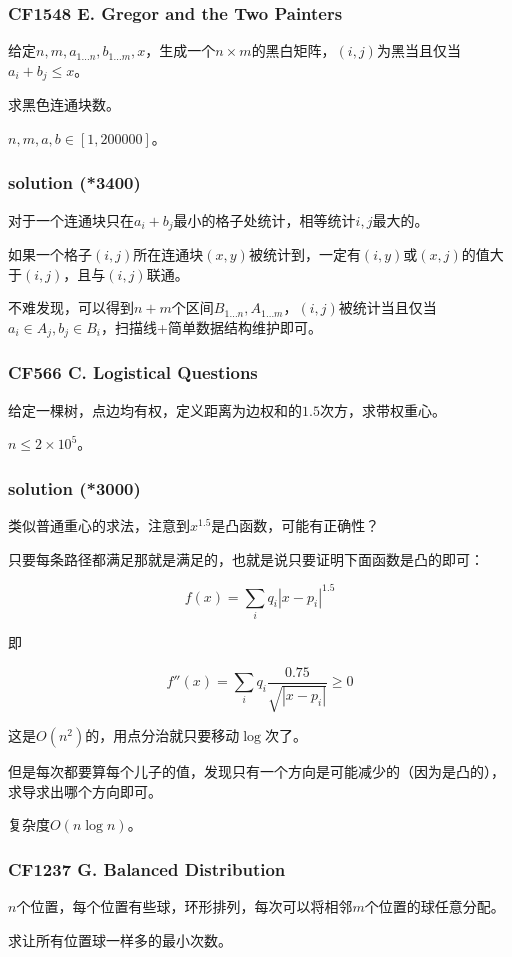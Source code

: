 \documentclass[10pt]{beamer}
\begin{document}
	\clearpage
	\begin{frame}
		\frametitle{CF1548 E. Gregor and the Two Painters}
	
		给定$n,m,a_{1\dots n},b_{1\dots m},x$，生成一个$n\times m$的黑白矩阵，$(i,j)$为黑当且仅当$a_i+b_j\le x$。
		
		求黑色连通块数。

		$n,m,a,b\in [1,200000]$。
	
	\end{frame}
	\clearpage
	\begin{frame}
		\frametitle{solution (*3400)}
	
		对于一个连通块只在$a_i+b_j$最小的格子处统计，相等统计$i,j$最大的。

		如果一个格子$(i,j)$所在连通块$(x,y)$被统计到，一定有$(i,y)$或$(x,j)$的值大于$(i,j)$，且与$(i,j)$联通。

		不难发现，可以得到$n+m$个区间$B_{1\dots n},A_{1\dots m}$，$(i,j)$被统计当且仅当$a_i\in A_j,b_j\in B_i$，扫描线+简单数据结构维护即可。
	
	\end{frame}
	\clearpage
	\begin{frame}
		\frametitle{CF566 C. Logistical Questions}
	
		给定一棵树，点边均有权，定义距离为边权和的$1.5$次方，求带权重心。

		$n\le 2\times 10^5$。
	
	\end{frame}
	\clearpage
	\begin{frame}
		\frametitle{solution (*3000)}
	
		类似普通重心的求法，注意到$x^{1.5}$是凸函数，可能有正确性？

		只要每条路径都满足那就是满足的，也就是说只要证明下面函数是凸的即可：

		$$
		f(x)=\sum_i q_i|x-p_i|^{1.5}
		$$

		即

		$$
		f''(x)=\sum_i q_i\dfrac{0.75}{\sqrt{|x-p_i|}}\ge 0
		$$

		这是$O(n^2)$的，用点分治就只要移动$\log$次了。

		但是每次都要算每个儿子的值，发现只有一个方向是可能减少的（因为是凸的），求导求出哪个方向即可。

		复杂度$O(n\log n)$。

	\end{frame}
	\clearpage
	\begin{frame}
		\frametitle{CF1237 G. Balanced Distribution}
	
		$n$个位置，每个位置有些球，环形排列，每次可以将相邻$m$个位置的球任意分配。

		求让所有位置球一样多的最小次数。
	
	\end{frame}	
\end{document}
